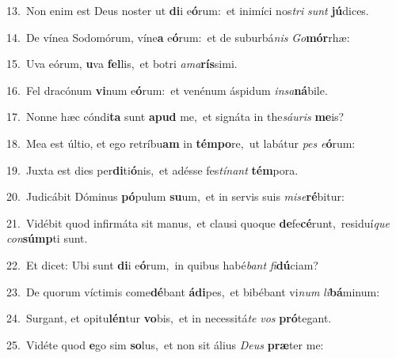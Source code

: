 {\numbfont\textcolor{\numbcolor}{13.}}~Non enim est Deus noster ut \textbf{di}\-i e\-\textbf{ó}\-rum:~\star et inimíci nos\textit{tri} \textit{sunt} \textbf{jú}\-dices.\par
{\numbfont\textcolor{\numbcolor}{14.}}~De vínea Sodomórum, víne\textbf{a} e\-\textbf{ó}\-rum:~\star et de suburbá\textit{nis} \textit{Go}\-\textbf{mór}rhæ:\par
{\numbfont\textcolor{\numbcolor}{15.}}~Uva eórum, \textbf{u}\-va \textbf{fel}\-lis,~\star et botri \textit{a}\-\textit{ma}\textbf{rís}simi.\par
{\numbfont\textcolor{\numbcolor}{16.}}~Fel dracónum \textbf{vi}\-num e\-\textbf{ó}\-rum:~\star et venénum áspidum \textit{in}\-\textit{sa}\textbf{ná}bile.\par
{\numbfont\textcolor{\numbcolor}{17.}}~Nonne hæc cóndi\textbf{ta} sunt \textbf{a}\-\textbf{pud} me,~\star et signáta in the\-\textit{sáu}\-\textit{ris} \textbf{me}\-is?\par
{\numbfont\textcolor{\numbcolor}{18.}}~Mea est últio, et ego retríbu\textbf{am} in \textbf{tém}\-\textbf{po}re,~\star ut labátur \textit{pes} \textit{e}\-\textbf{ó}rum:\par
{\numbfont\textcolor{\numbcolor}{19.}}~Juxta est dies per\-\textbf{di}\-ti\-\textbf{ó}\-nis,~\star et adésse fes\-\textit{tí}\-\textit{nant} \textbf{tém}\-pora.\par
{\numbfont\textcolor{\numbcolor}{20.}}~Judicábit Dóminus \textbf{pó}\-pulum \textbf{su}\-um,~\star et in servis suis \textit{mi}\-\textit{se}\textbf{ré}bitur:\par
{\numbfont\textcolor{\numbcolor}{21.}}~Vidébit quod infirmáta sit manus,~\dagger et clausi quoque \textbf{de}\-fe\-\textbf{cé}\-runt,~\star residuí\textit{que} \textit{con}\-\textbf{súmp}ti sunt.\par
{\numbfont\textcolor{\numbcolor}{22.}}~Et dicet: Ubi sunt \textbf{di}\-i e\-\textbf{ó}\-rum,~\star in quibus habé\textit{bant} \textit{fi}\-\textbf{dú}ciam?\par
{\numbfont\textcolor{\numbcolor}{23.}}~De quorum víctimis come\-\textbf{dé}\-bant \textbf{á}\-\textbf{di}pes,~\star et bibébant vi\textit{num} \textit{li}\-\textbf{bá}minum:\par
{\numbfont\textcolor{\numbcolor}{24.}}~Surgant, et opitu\-\textbf{lén}\-tur \textbf{vo}\-bis,~\star et in necessitá\textit{te} \textit{vos} \textbf{pró}\-tegant.\par
{\numbfont\textcolor{\numbcolor}{25.}}~Vidéte quod \textbf{e}\-go sim \textbf{so}\-lus,~\star et non sit álius \textit{De}\-\textit{us} \textbf{præ}\-ter me:\par
